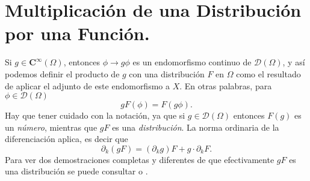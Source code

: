 \documentclass[letter,12pt]{article}
\begin{document}
\section{Multiplicación de una Distribución por una Función.}
Si $ g \in \mathbf{C}^\infty(\Omega) $, entonces $ \phi \to g\phi $ es un endomorfismo
continuo de $ \mathscr{D}(\Omega) $, y así podemos definir el producto de $ g $ con 
una distribución $ F $ en $ \Omega $ como el resultado de aplicar el adjunto de este
endomorfismo a $ X $. En otras palabras, para $ \phi \in \mathscr{D}(\Omega) $
\begin{equation}
	gF(\phi) = F(g\phi).
\end{equation}
Hay que tener cuidado con la notación, ya que si $ g\in \mathscr{D}(\Omega) $ entonces
$  F(g) $ es un \textit{número}, mientras que $ gF $ es una \textit{distribución}.
La norma ordinaria de la diferenciación aplica, es decir que
\begin{equation*}
	\partial_{k}(gF) = (\partial_{k} g)F + g\cdot \partial_{k}F.
\end{equation*}
Para ver dos demostraciones completas y diferentes de que efectivamente
$ gF $ es una distribución se puede consultar \cite{Halperin} o \cite{Rudin}.

\newpage
\printbibliography
\end{document}

